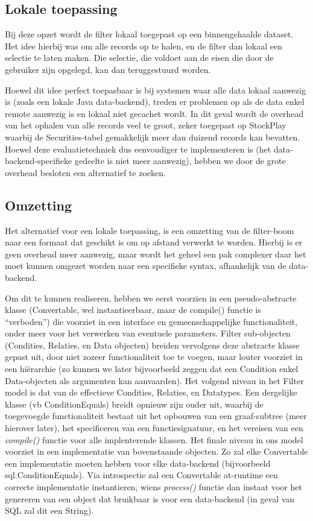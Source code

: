 \subsection{Lokale toepassing}

Bij deze opzet wordt de filter lokaal toegepast op een binnengehaalde dataset. Het idee hierbij was om alle records op te halen, en de filter dan lokaal een selectie te laten maken. Die selectie, die voldoet aan de eisen die door de gebruiker zijn opgelegd, kan dan teruggestuurd worden.

Hoewel dit idee perfect toepasbaar is bij systemen waar alle data lokaal aanwezig is (zoals een lokale Java data-backend), treden er problemen op als de data enkel remote aanwezig is en lokaal niet gecachet wordt. In dit geval wordt de overhead van het ophalen van alle records veel te groot, zeker toegepast op StockPlay waarbij de Securities-tabel gemakkelijk meer dan duizend records kan bevatten. Hoewel deze evaluatietechniek dus eenvoudiger te implementeren is (het data-backend-specifieke gedeelte is niet meer aanwezig), hebben we door de grote overhead besloten een alternatief te zoeken.

\subsection{Omzetting}

Het alternatief voor een lokale toepassing, is een omzetting van de filter-boom naar een formaat dat geschikt is om op afstand verwerkt te worden. Hierbij is er geen overhead meer aanwezig, maar wordt het geheel een pak complexer daar het moet kunnen omgezet worden naar een specifieke syntax, afhankelijk van de data-backend.

Om dit te kunnen realiseren, hebben we eerst voorzien in een pseudo-abstracte klasse (Convertable, wel instantieerbaar, maar de compile() functie is ``verboden'') die voorziet in een interface en gemeenschappelijke functionaliteit, onder meer voor het verwerken van eventuele parameters. Filter sub-objecten (Condities, Relaties, en Data objecten) breiden vervolgens deze abstracte klasse gepast uit, door niet zozeer functionaliteit toe te voegen, maar louter voorziet in een hi\"erarchie (zo kunnen we later bijvoorbeeld zeggen dat een Condition enkel Data-objecten als argumenten kan aanvaarden).
Het volgend niveau in het Filter model is dat van de effectieve Condities, Relaties, en Datatypes. Een dergelijke klasse (vb ConditionEquals) breidt opnieuw zijn ouder uit, waarbij de toegevoegde functionaliteit bestaat uit het opbouwen van een graaf-subtree (meer hierover later), het specificeren van een functiesignatuur, en het vereisen van een \emph{compile()} functie voor alle implenterende klassen.
Het finale niveau in ons model voorziet in een implementatie van bovenstaande objecten. Zo zal elke Convertable een implementatie moeten hebben voor elke data-backend (bijvoorbeeld sql.ConditionEquals). Via introspectie zal een Convertable at-runtime een correcte implementatie instantieren, wiens \emph{process()} functie dan instaat voor het genereren van een object dat bruikbaar is voor een data-backend (in geval van SQL zal dit een String).

